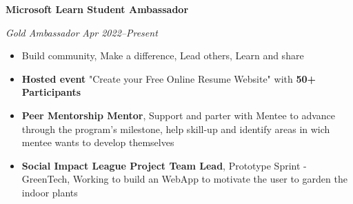 \textbf{Microsoft Learn Student Ambassador \hfill } \par
\textit{Gold Ambassador}  \hfill \textit{Apr 2022--Present}
\begin{itemize}
	\item Build community, Make a difference, Lead others, Learn and share
	\item \textbf{Hosted event} "Create your Free Online Resume Website" with \textbf{50+ Participants}
	\item \textbf{Peer Mentorship Mentor}, Support and parter with Mentee to advance through the program's milestone, help skill-up and identify areas in wich mentee wants to develop themselves
	\item \textbf{Social Impact League Project Team Lead}, Prototype Sprint - GreenTech, Working to build an WebApp to motivate the user to garden the indoor plants
\end{itemize}\par

